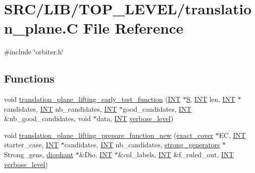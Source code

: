 \hypertarget{translation__plane_8_c}{}\section{S\+R\+C/\+L\+I\+B/\+T\+O\+P\+\_\+\+L\+E\+V\+E\+L/translation\+\_\+plane.C File Reference}
\label{translation__plane_8_c}
{\ttfamily \#include \char`\"{}orbiter.\+h\char`\"{}}\newline
\subsection*{Functions}
\begin{DoxyCompactItemize}
\item 
void \mbox{\hyperlink{translation__plane_8_c_ace697f7b743aa75575a58166816a282d}{translation\+\_\+plane\+\_\+lifting\+\_\+early\+\_\+test\+\_\+function}} (\mbox{\hyperlink{galois_8h_a09fddde158a3a20bd2dcadb609de11dc}{I\+NT}} $\ast$\mbox{\hyperlink{simeon_8_c_adab47f8243f1b5a2c31df2535d6b37d0}{S}}, \mbox{\hyperlink{galois_8h_a09fddde158a3a20bd2dcadb609de11dc}{I\+NT}} len, \mbox{\hyperlink{galois_8h_a09fddde158a3a20bd2dcadb609de11dc}{I\+NT}} $\ast$candidates, \mbox{\hyperlink{galois_8h_a09fddde158a3a20bd2dcadb609de11dc}{I\+NT}} nb\+\_\+candidates, \mbox{\hyperlink{galois_8h_a09fddde158a3a20bd2dcadb609de11dc}{I\+NT}} $\ast$good\+\_\+candidates, \mbox{\hyperlink{galois_8h_a09fddde158a3a20bd2dcadb609de11dc}{I\+NT}} \&nb\+\_\+good\+\_\+candidates, void $\ast$data, \mbox{\hyperlink{galois_8h_a09fddde158a3a20bd2dcadb609de11dc}{I\+NT}} \mbox{\hyperlink{simeon_8_c_a818073fbcc2f439e7c56952f67386122}{verbose\+\_\+level}})
\item 
void \mbox{\hyperlink{translation__plane_8_c_a9f6016446941b13afad657c3459ca1c6}{translation\+\_\+plane\+\_\+lifting\+\_\+prepare\+\_\+function\+\_\+new}} (\mbox{\hyperlink{classexact__cover}{exact\+\_\+cover}} $\ast$EC, \mbox{\hyperlink{galois_8h_a09fddde158a3a20bd2dcadb609de11dc}{I\+NT}} starter\+\_\+case, \mbox{\hyperlink{galois_8h_a09fddde158a3a20bd2dcadb609de11dc}{I\+NT}} $\ast$candidates, \mbox{\hyperlink{galois_8h_a09fddde158a3a20bd2dcadb609de11dc}{I\+NT}} nb\+\_\+candidates, \mbox{\hyperlink{classstrong__generators}{strong\+\_\+generators}} $\ast$Strong\+\_\+gens, \mbox{\hyperlink{classdiophant}{diophant}} $\ast$\&Dio, \mbox{\hyperlink{galois_8h_a09fddde158a3a20bd2dcadb609de11dc}{I\+NT}} $\ast$\&col\+\_\+labels, \mbox{\hyperlink{galois_8h_a09fddde158a3a20bd2dcadb609de11dc}{I\+NT}} \&f\+\_\+ruled\+\_\+out, \mbox{\hyperlink{galois_8h_a09fddde158a3a20bd2dcadb609de11dc}{I\+NT}} \mbox{\hyperlink{simeon_8_c_a818073fbcc2f439e7c56952f67386122}{verbose\+\_\+level}})

\end{DoxyCompactItemize}
